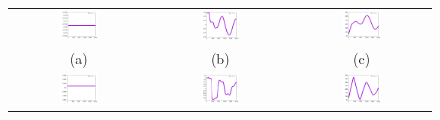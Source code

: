 \documentclass[letterpaper,12pt]{article}
\begin{document}
    \begin{figure}[H]
        \centering
        \begin{tabular}{ccc}
            \includegraphics[width=0.3\textwidth]{Hw0.59.png}
            &
            \includegraphics[width=0.3\textwidth]{pw0.59.png}
            &
            \includegraphics[width=0.3\textwidth]{xw0.59.png}
            \\
            (a) & (b) & (c)
            \\
            \includegraphics[width=0.3\textwidth]{Hw1.png}
            &
            \includegraphics[width=0.3\textwidth]{pw1.png}
            &
            \includegraphics[width=0.3\textwidth]{xw1.png}

\end{tabular}
\end{figure}
\end{document}
